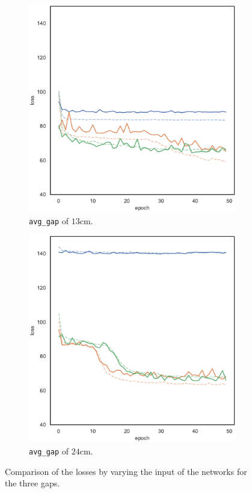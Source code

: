 \begin{figure}[!htb]
\begin{subfigure}[h]{0.3\textwidth}
		\includegraphics[width=\textwidth]{contents/images/task1/loss-distributed-gap_13@copy}%
		\caption{\texttt{avg\_gap} of $13$cm.}
	\end{subfigure}
	\hfill
	\begin{subfigure}[h]{0.3\textwidth}
		\centering
		\includegraphics[width=\textwidth]{contents/images/task1/loss-distributed-gap_24@copy}
		\caption{\texttt{avg\_gap} of $24$cm.}
	\end{subfigure}
	\caption[Losses summary of the first set of experiments.]{Comparison 
		of the losses by varying the input of the networks for the three gaps.}
	\label{fig:distloss81324}
\end{figure}

